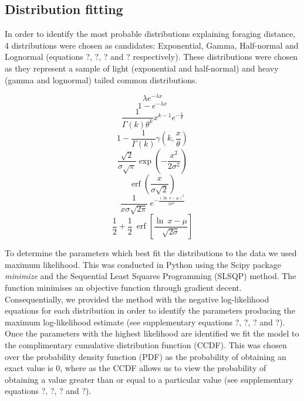 \documentclass[11pt,usenames,dvipsnames]{article}
\DeclareMathOperator\erf{erf}
\begin{document}
\subsection{Distribution fitting}

\begin{linenumbers}
\hspace{\parindent}
In order to identify the most probable distributions explaining foraging distance, 4 distributions were chosen as candidates: Exponential, Gamma, Half-normal and Lognormal (equations ?, ?, ? and ? respectively). These distributions were chosen as they represent a sample of light (exponential and half-normal) and heavy (gamma and lognormal) tailed common distributions.
\end{linenumbers}
\begin{equation}
\lambda e^{-\lambda x}
\end{equation}
\begin{equation}
1 - e^{-\lambda x}
\end{equation}
\begin{equation}
\frac{1}{\Gamma(k)\theta^k}x^{k-1}e^{-\frac{x}{\theta}}
\end{equation}
\begin{equation}
1 - \frac{1}{\Gamma(k)}\gamma(k,\frac{x}{\theta})
\end{equation}
\begin{equation}
\frac{\sqrt{2}}{\sigma \sqrt{\pi}} \exp \left(-\frac{x^2}{2 \sigma^2}\right)
\end{equation}
\begin{equation}
\erf\left(\frac{x}{\sigma \sqrt{2}}\right)
\end{equation}
\begin{equation}
\frac{1}{x \sigma \sqrt{2 \pi}}\ e^{- \frac{(\ln\ x - \mu)^2}{2\sigma^2}}
\end{equation}
\begin{equation}
\frac{1}{2} + \frac{1}{2}\ \erf\left[\frac{\ln\ x - \mu}{\sqrt{2 \sigma}}\right]
\end{equation}

\begin{linenumbers}
To determine the parameters which best fit the distributions to the data we used maximum likelihood. This was conducted in Python using the Scipy package \textit{minimize} and the Sequential Least Squares Programming (SLSQP) method. The function minimises an objective function through gradient decent. Consequentially, we provided the method with the negative log-likelihood equations for each distribution in order to identify the parameters producing the maximum log-likelihood estimate (see supplementary equations ?, ?, ? and ?). Once the parameters with the highest likelihood are identified we fit the model to the complimentary cumulative distribution function (CCDF). This was chosen over the probability density function (PDF) as the probability of obtaining an exact value is 0, where as the CCDF allows us to view the probability of obtaining a value greater than or equal to a particular value (see supplementary equations ?, ?, ? and ?). 
\end{linenumbers}
\end{document}
